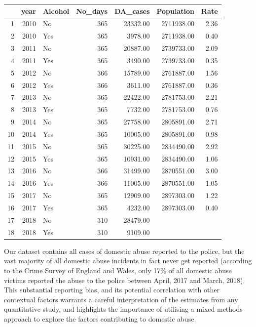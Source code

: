 \documentclass[12pt, letterpaper]{article}
\begin{document}
\begin{table}[ht]
\centering
\begin{tabular}{rrlrrrr}
  \hline
 & year & Alcohol & No\_days & DA\_cases & Population & Rate \\ 
  \hline
1 & 2010 & No & 365 & 23332.00 & 2711938.00 & 2.36 \\ 
  2 & 2010 & Yes & 365 & 3978.00 & 2711938.00 & 0.40 \\ 
  3 & 2011 & No & 365 & 20887.00 & 2739733.00 & 2.09 \\ 
  4 & 2011 & Yes & 365 & 3490.00 & 2739733.00 & 0.35 \\ 
  5 & 2012 & No & 366 & 15789.00 & 2761887.00 & 1.56 \\ 
  6 & 2012 & Yes & 366 & 3611.00 & 2761887.00 & 0.36 \\ 
  7 & 2013 & No & 365 & 22422.00 & 2781753.00 & 2.21 \\ 
  8 & 2013 & Yes & 365 & 7732.00 & 2781753.00 & 0.76 \\ 
  9 & 2014 & No & 365 & 27758.00 & 2805891.00 & 2.71 \\ 
  10 & 2014 & Yes & 365 & 10005.00 & 2805891.00 & 0.98 \\ 
  11 & 2015 & No & 365 & 30225.00 & 2834490.00 & 2.92 \\ 
  12 & 2015 & Yes & 365 & 10931.00 & 2834490.00 & 1.06 \\ 
  13 & 2016 & No & 366 & 31499.00 & 2870551.00 & 3.00 \\ 
  14 & 2016 & Yes & 366 & 11005.00 & 2870551.00 & 1.05 \\ 
  15 & 2017 & No & 365 & 12909.00 & 2897303.00 & 1.22 \\ 
  16 & 2017 & Yes & 365 & 4232.00 & 2897303.00 & 0.40 \\ 
  17 & 2018 & No & 310 & 28479.00 &  &  \\ 
  18 & 2018 & Yes & 310 & 9109.00 &  &  \\ 
   \hline
\end{tabular}
\end{table}

Our dataset contains all cases of domestic abuse reported to the police, but the vast majority of all domestic abuse incidents in fact never get reported (according to the Crime Survey of England and Wales, only 17\% of all domestic abuse victims reported the abuse to the police between April, 2017 and March, 2018\autocite{ONS}). This substantial reporting bias, and its potential correlation with other contextual factors warrants a careful interpretation of the estimates from any quantitative study, and highlights the importance of utilising a mixed methods approach to explore the factors contributing to domestic abuse. 
\end{document}
